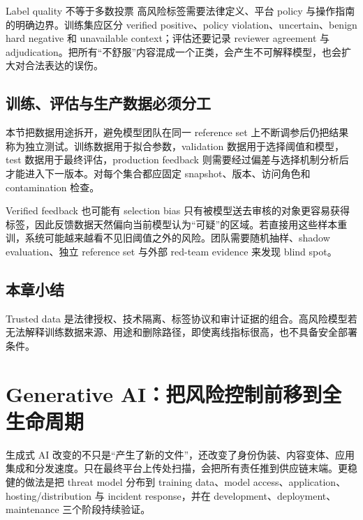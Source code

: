\documentclass[a4paper]{article}
\begin{document}
\begin{importantbox}{Label quality 不等于多数投票}
高风险标签需要法律定义、平台 policy 与操作指南的明确边界。训练集应区分 verified positive、policy violation、uncertain、benign hard negative 和 unavailable context；评估还要记录 reviewer agreement 与 adjudication。把所有“不舒服”内容混成一个正类，会产生不可解释模型，也会扩大对合法表达的误伤。
\end{importantbox}


\subsection{训练、评估与生产数据必须分工}

本节把数据用途拆开，避免模型团队在同一 reference set 上不断调参后仍把结果称为独立测试。训练数据用于拟合参数，validation 数据用于选择阈值和模型，test 数据用于最终评估，production feedback 则需要经过偏差与选择机制分析后才能进入下一版本。对每个集合都应固定 snapshot、版本、访问角色和 contamination 检查。

\begin{warningbox}{Verified feedback 也可能有 selection bias}
只有被模型送去审核的对象更容易获得标签，因此反馈数据天然偏向当前模型认为“可疑”的区域。若直接用这些样本重训，系统可能越来越看不见旧阈值之外的风险。团队需要随机抽样、shadow evaluation、独立 reference set 与外部 red-team evidence 来发现 blind spot。
\end{warningbox}

\subsection{本章小结}

Trusted data 是法律授权、技术隔离、标签协议和审计证据的组合。高风险模型若无法解释训练数据来源、用途和删除路径，即使离线指标很高，也不具备安全部署条件。

\section{Generative AI：把风险控制前移到全生命周期}

生成式 AI 改变的不只是“产生了新的文件”，还改变了身份伪装、内容变体、应用集成和分发速度。只在最终平台上传处扫描，会把所有责任推到供应链末端。更稳健的做法是把 threat model 分布到 training data、model access、application、hosting/distribution 与 incident response，并在 development、deployment、maintenance 三个阶段持续验证。
\end{document}
